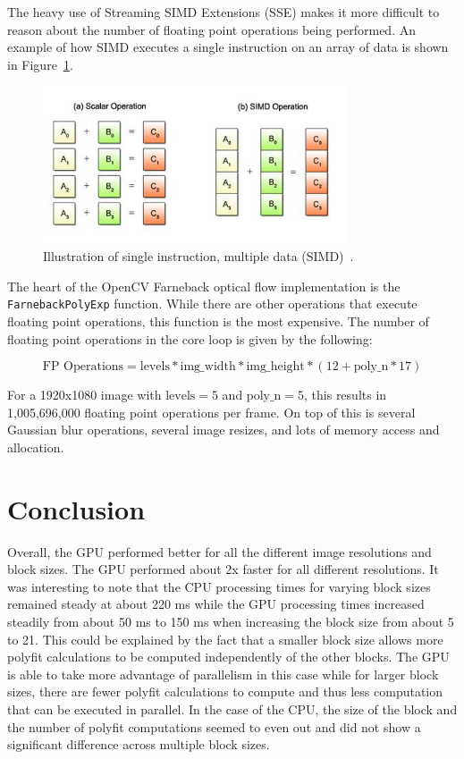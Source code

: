 \documentclass[12pt,letterpaper]{article}
\begin{document}
The heavy use of Streaming SIMD Extensions (SSE) makes it more difficult to
reason about the number of floating point operations being performed. An
example of how SIMD executes a single instruction on an array of data is shown
in Figure~\ref{fig:simd}.

\begin{figure}[h]
  \centering
    \includegraphics[width=0.8\textwidth]{img/simd.jpg}
  \caption{Illustration of single instruction, multiple data (SIMD)~\cite{simd}.}
  \label{fig:simd}
\end{figure}

The heart of the OpenCV Farneback optical flow implementation is the
\texttt{FarnebackPolyExp} function. While there are other operations that
execute floating point operations, this function is the most expensive. The
number of floating point operations in the core loop is given by the following:

$$
\text{FP Operations} = \text{levels} * \text{img\_width} * \text{img\_height}
                * (12 + \text{poly\_n} * 17)
$$

For a 1920x1080 image with $\text{levels}=5$ and $\text{poly\_n}=5$, this
results in 1,005,696,000 floating point operations per frame. On top of this is
several Gaussian blur operations, several image resizes, and lots of memory
access and allocation.

\section{Conclusion}
Overall, the GPU performed better for all the different image resolutions and
block sizes. The GPU performed about 2x faster for all different resolutions.
It was interesting to note that the CPU processing times for varying block
sizes remained steady at about 220 ms while the GPU processing times
increased steadily from about 50 ms to 150 ms when increasing the block size
from about 5 to 21. This could be explained by the fact that a smaller block
size allows more polyfit calculations to be computed independently of the other
blocks. The GPU is able to take more advantage of parallelism in this case
while for larger block sizes, there are fewer polyfit calculations to compute
and thus less computation that can be executed in parallel. In the case of the
CPU, the size of the block and the number of polyfit computations seemed to
even out and did not show a significant difference across multiple block sizes.
\end{document}
